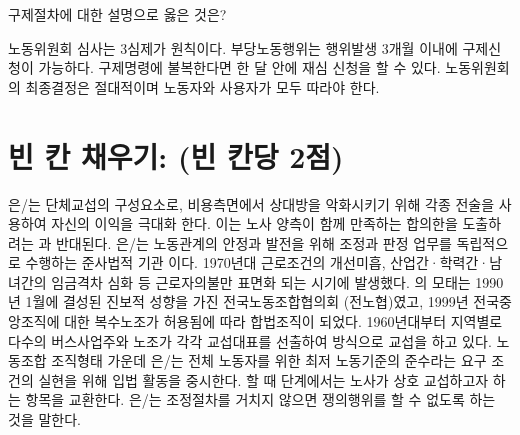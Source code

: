 \documentclass[11pt,]{exam} %
\begin{document}
\begin{questions}
 구제절차에 대한 설명으로 옳은 것은?
    \begin{choices}
    \choice\relax 노동위원회 심사는 3심제가 원칙이다.
    \CorrectChoice\relax 부당노동행위는 행위발생 3개월 이내에 구제신청이 가능하다.
    \choice\relax 구제명령에 불복한다면 한 달 안에 재심 신청을 할 수 있다.
    \choice\relax 노동위원회의 최종결정은 절대적이며 노동자와 사용자가 모두 따라야 한다.
    \end{choices}
\pagebreak

\section*{빈 칸 채우기: (빈 칸당 2점)}

\question\fillin[분배적 교섭]{}은/는 단체교섭의 구성요소로, 비용측면에서 상대방을 악화시키기 위해 각종 전술을 사용하여 자신의 이익을 극대화 한다. 이는 노사 양측이 함께 만족하는 합의한을 도출하려는 \fillin[통합적 교섭]{}과 반대된다.
\question\fillin[노동위원회]{}은/는 노동관계의 안정과 발전을 위해 조정과 판정 업무를 독립적으로 수행하는 준사법적 기관 이다.
\question\fillin[전태일 사건]{} 1970년대 근로조건의 개선미흡, 산업간·학력간·남녀간의 임금격차 심화 등 근로자의불만 표면화 되는 시기에 발생했다.
\question\fillin[민주노총]{}의 모태는 1990년 1월에 결성된 진보적 성향을 가진 전국노동조합협의회 (전노협)였고, 1999년 전국중앙조직에 대한 복수노조가 허용됨에 따라 합법조직이 되었다.
 1960년대부터 지역별로 다수의 버스사업주와 노조가 각각 교섭대표를 선출하여 \fillin[집단교섭]{} 방식으로 교섭을 하고 있다.
 노동조합 조직형태 가운데 \fillin[일반조합]{}은/는 전체 노동자를 위한 최저 노동기준의 준수라는 요구 조건의 실현을 위해 입법 활동을 중시한다.
 할 때 \fillin[예비회담]{} 단계에서는 노사가 상호 교섭하고자 하는 항목을 교환한다.
\question\fillin[조정전치주의]{}은/는 조정절차를 거치지 않으면 쟁의행위를 할 수 없도록 하는 것을 말한다.

\end{questions}
\end{document}
